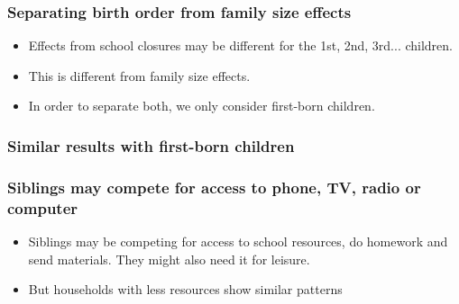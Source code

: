 \documentclass{beamer}
\begin{document}
\begin{frame}
    \label{frame:birthorder}
    \frametitle{Separating birth order from family size effects}
       \begin{itemize}
           \item Effects from school closures may be different for the 1st, 2nd, 3rd... children.
           \item This is different from family size effects.
           \item In order to separate both, we only consider first-born children.
       \end{itemize}
\end{frame}

\begin{frame}
    \label{frame:birthorder_intro}
    \frametitle{Similar results with first-born children}
        {
    }  

    \begin{flushleft}
        \hyperlink{frame:mechanisms}{}
    \end{flushleft}
\end{frame}


\begin{frame}
    \label{frame:resources_intro}
    \frametitle{Siblings may compete for access to phone, TV, radio or computer}
       \begin{itemize}
           \item Siblings may be competing for access to school resources, do homework and send materials. They might also need it for leisure.
           \item But households with less resources show similar patterns 
       \end{itemize}
\end{frame}
\end{document}
